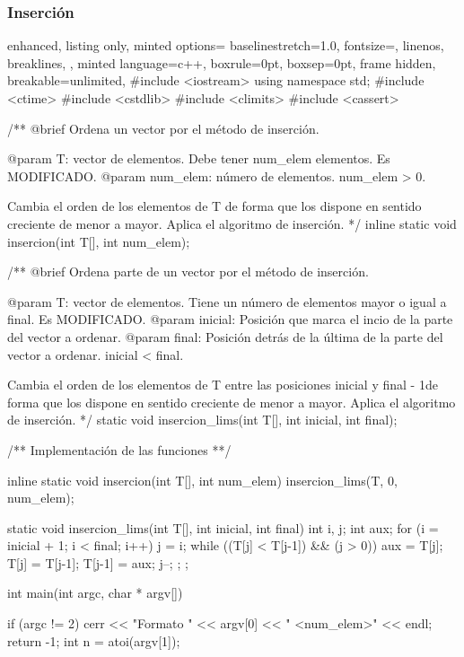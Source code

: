 \documentclass[12pt,spanish]{article}
\begin{document}
\subsubsection{Inserción}
\begin{multicols}{2}
\begin{tcblisting}
{
  enhanced,
  listing only,
  minted options={
    baselinestretch=1.0,
    fontsize=\footnotesize,
    linenos,
    breaklines,
  },
  minted language=c++,
  boxrule=0pt,
  boxsep=0pt,
  frame hidden,
  breakable=unlimited,
}
#include <iostream>
using namespace std;
#include <ctime>
#include <cstdlib>
#include <climits>
#include <cassert>

/**
   @brief Ordena un vector por el método de inserción.

   @param T: vector de elementos. Debe tener num_elem elementos.
             Es MODIFICADO.
   @param num_elem: número de elementos. num_elem > 0.

   Cambia el orden de los elementos de T de forma que los dispone
   en sentido creciente de menor a mayor.
   Aplica el algoritmo de inserción.
*/
inline static 
void insercion(int T[], int num_elem);

/**
   @brief Ordena parte de un vector por el método de inserción.

   @param T: vector de elementos. Tiene un número de elementos 
                   mayor o igual a final. Es MODIFICADO.
   @param inicial: Posición que marca el incio de la parte del
                   vector a ordenar.
   @param final: Posición detrás de la última de la parte del
                   vector a ordenar. 
		   inicial < final.

   Cambia el orden de los elementos de T entre las posiciones
   inicial y final - 1de forma que los dispone en sentido creciente
   de menor a mayor.
   Aplica el algoritmo de inserción.
*/
static void insercion_lims(int T[], int inicial, int final);

/**
   Implementación de las funciones
**/

inline static void insercion(int T[], int num_elem){
  insercion_lims(T, 0, num_elem);
}

static void insercion_lims(int T[], int inicial, int final){
  int i, j;
  int aux;
  for (i = inicial + 1; i < final; i++) {
    j = i;
    while ((T[j] < T[j-1]) && (j > 0)) {
      aux = T[j];
      T[j] = T[j-1];
      T[j-1] = aux;
      j--;
    };
  };
}

int main(int argc, char * argv[]){ 
    if (argc != 2){
      cerr << "Formato " << argv[0] << " <num_elem>" << endl;
      return -1;
    }
  int n = atoi(argv[1]);

}
\end{tcblisting}
\end{multicols}
\end{document}
